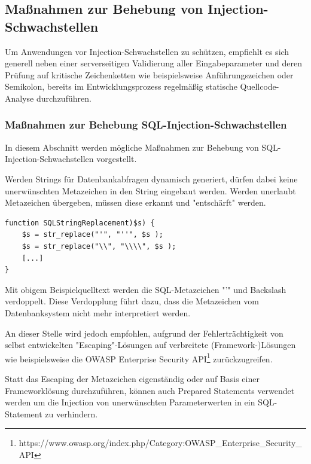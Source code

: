 \subsection{Maßnahmen zur Behebung von Injection-Schwachstellen}

Um Anwendungen vor Injection-Schwachstellen zu schützen, empfiehlt es sich generell neben einer serverseitigen Validierung aller Eingabeparameter und deren Prüfung auf kritische Zeichenketten wie beispielsweise Anführungszeichen oder Semikolon, bereits im Entwicklungsprozess regelmäßig statische Quellcode-Analyse durchzuführen.

\subsubsection{Maßnahmen zur Behebung SQL-Injection-Schwachstellen}
In diesem Abschnitt werden mögliche Maßnahmen zur Behebung von SQL-Injection-Schwachstellen vorgestellt.

\label{escpace_metazeichen}

Werden Strings für Datenbankabfragen dynamisch generiert, dürfen dabei keine unerwünschten Metazeichen in den String eingebaut werden. Werden unerlaubt Metazeichen übergeben, müssen diese erkannt und "entschärft" werden.

\begin{lstlisting}[basicstyle=\ttfamily\footnotesize]
function SQLStringReplacement)$s) {
    $s = str_replace("'", "''", $s );
    $s = str_replace("\\", "\\\\", $s );
    [...]
}
\end{lstlisting}


Mit obigem Beispielquelltext werden die SQL-Metazeichen "'" und Backslash verdoppelt. Diese Verdopplung führt dazu, dass die Metazeichen vom Datenbanksystem nicht mehr interpretiert werden. 

An dieser Stelle wird jedoch empfohlen, aufgrund der Fehlerträchtigkeit von selbst entwickelten "Escaping"-Lösungen auf verbreitete (Framework-)Lösungen wie beispielsweise die OWASP Enterprise Security API\footnote{https://www.owasp.org/index.php/Category:OWASP\_Enterprise\_Security\_API} zurückzugreifen.


Statt das Escaping der Metazeichen eigenständig oder auf Basis einer Frameworklösung durchzuführen, können auch Prepared Statements verwendet werden um die Injection von unerwünschten Parameterwerten in ein SQL-Statement zu verhindern.

